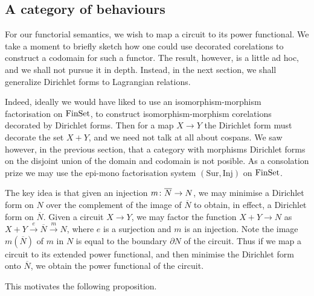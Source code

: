 \subsection{A category of behaviours}

For our functorial semantics, we wish to map a circuit to its power functional.
We take a moment to briefly sketch how one could use decorated corelations to
construct a codomain for such a functor. The result, however, is a little ad
hoc, and we shall not pursue it in depth. Instead, in the next section, we shall
generalize Dirichlet forms to Lagrangian relations.

Indeed, ideally we would have liked to use an isomorphism-morphism factorisation on
$\mathrm{FinSet}$, to construct isomorphism-morphism corelations decorated by Dirichlet
forms. Then for a map $X \to Y$ the Dirichlet form must decorate the set
$X+Y$, and we need not talk at all about cospans. We saw however, in the
previous section, that a category with morphisms Dirichlet forms on the disjoint
union of the domain and codomain is not posible.  As a consolation prize we may
use the epi-mono factorisation system $(\mathrm{Sur},\mathrm{Inj})$ on
$\mathrm{FinSet}$. 

The key idea is that given an injection $m{\colon} \overline N \to N$, we may
minimise a Dirichlet form on $N$ over the complement of the image of $\overline
N$ to obtain, in effect, a Dirichlet form on $\overline N$. Given a circuit $X
\to Y$, we may factor the function $X+Y \to N$ as $X+Y \stackrel{e}\to
\overline{N} \stackrel{m}\to N$, where $e$ is a surjection and $m$ is an
injection. Note the image $m(\overline{N})$ of $m$ in $N$ is equal to the
boundary $\partial N$ of the circuit. Thus if we map a circuit to its extended
power functional, and then minimise the Dirichlet form onto $\overline N$, we
obtain the power functional of the circuit. 

This motivates the following proposition. 

